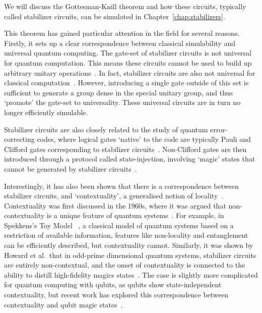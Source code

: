 We will discuss the Gottesman-Knill theorem and how these circuits, typically called stabilizer circuits, can be simulated in Chapter~\ref{chap:stabilizers}.\par
This theorem has gained particular attention in the field for several reasons. Firstly, it sets up a clear correspondence between classical simulability and universal quantum computing. The gate-set of stabilizer circuits is not universal for quantum computation. This means these circuits cannot be used to build up arbitrary unitary operations~\cite{Nielsen2000}. In fact, stabilizer circuits are also not universal for classical computation~\cite{Aaronson2004}. However, introducing a single gate outside of this set is sufficient to generate a group dense in the special unitary group, and thus `promote' the gate-set to universality. These universal circuits are in turn no longer efficiently simulable.\par
Stabilizer circuits are also closely related to the study of quantum error-correcting codes, where logical gates `native' to the code are typically Pauli and Clifford gates corresponding to stabilizer circuits~\cite{Nielsen2000}. Non-Clifford gates are then introduced through a protocol called state-injection, involving `magic' states that cannot be generated by stabilizer circuits~\cite{Gottesman1999,Bravyi2005}.\par
Interestingly, it has also been shown that there is a correspondence between stabilizer circuits, and `contextuality', a generalised notion of locality~\cite{Howard2014}. Contextuality was first discussed in the 1960s, where it was argued that non-contextuality is a unique feature of quantum systems~\cite{Bell1966,Kochen1967}. For example, in Spekkens's Toy Model ~\cite{Kochen1967}, a classical model of quantum systems based on a restriction of available information, features like non-locality and entanglement can be efficiently described, but contextuality cannot. Similarly, it was shown by Howard et al.\ that in odd-prime dimensional quantum systems, stabilizer circuits are entirely non-contextual, and the onset of contextuality is connected to the ability to distill high-fidelity magics states~\cite{Howard2014}. The case is slightly more complicated for quantum computing with qubits, as qubits show state-independent contextuality, but recent work has explored this correspondence between contextuality and qubit magic states~\cite{BermejoVega2017}.
